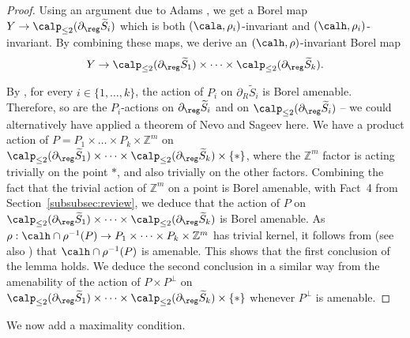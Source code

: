 \begin{proof}
Using an argument due to Adams \cite[Lem.\,3.2 \&~3.3]{Ada}, we get a Borel map $Y\to \calp_{\le 2}(\partial_\reg \widetilde{S}_i)$ which is both $(\cala,\rho_i)$-invariant and $(\calh,\rho_i)$-invariant. By combining these maps, we derive an $(\calh,\rho)$-invariant Borel map\vspace*{-3pt}
\[
Y\to \calp_{\le 2}(\partial_\reg \widetilde{S}_1)\times\dots\times \calp_{\le 2}(\partial_\reg \widetilde{S}_k).
\]

By \cite[Th.\,5.11]{Duc}, for every $i\in\{1,\dots,k\}$, the action of $P_i$ on $\partial_R \widetilde{S}_i$ is Borel amenable. Therefore, so are the $P_i$-actions on $\partial_\reg \widetilde{S}_i$ and on $\calp_{\le 2}(\partial_\reg\widetilde{S}_i)$ -- we could alternatively have applied a theorem of Nevo and Sageev \cite[Th.\,7.2]{NS} here. We have a product action of $P=P_1\times\dots\times P_k\times \mathbb{Z}^m$ on $\calp_{\le 2}(\partial_\reg \widetilde{S}_1)\times\dots\times \calp_{\le 2}(\partial_\reg \widetilde{S}_k)\times\{*\}$, where the $\mathbb{Z}^m$ factor is acting trivially on the point $\ast$, and also trivially on the other factors. Combining the fact that the trivial action of $\mathbb{Z}^m$ on a point is Borel amenable, with Fact~4 from Section~\ref{subsubsec:review}, we deduce that the action of $P$ on $\calp_{\le 2}(\partial_\reg \widetilde{S}_1)\times\dots\times \calp_{\le 2}(\partial_\reg \widetilde{S}_k)$ is Borel amenable. As $\rho:\calh \cap\rho^{-1}(P)\to P_1\times\dots\times P_k\times\mathbb{Z}^m$ has trivial kernel, it follows from \cite[Prop.\,4.33]{Kid-memoir} (see also \cite[Prop.\,3.38]{GH}) that $\calh \cap\rho^{-1}(P)$ is amenable. This shows that the first conclusion of the lemma holds. We deduce the second conclusion in a similar way from the amenability of the action of $P\times P^\perp$ on $\calp_{\le 2}(\partial_\reg \widetilde{S}_1)\times\dots\times \calp_{\le 2}(\partial_\reg \widetilde{S}_k)\times\{*\}$ whenever $P^\perp$ is amenable.
\end{proof}

We now add a maximality condition.

